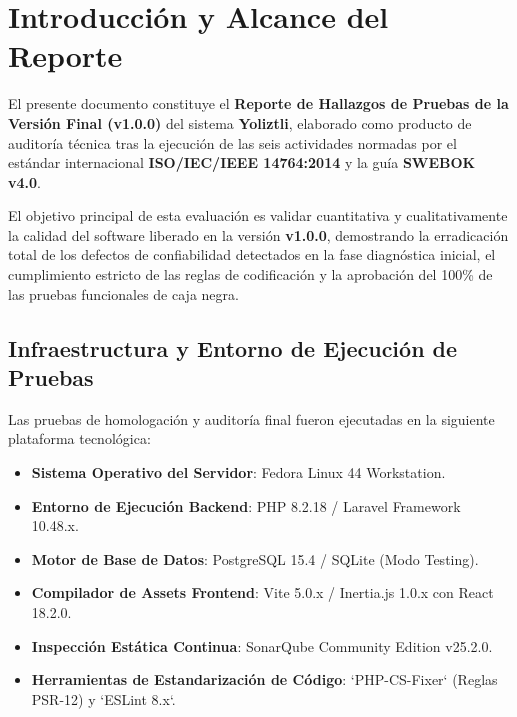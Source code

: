 \documentclass[12pt]{article}
\begin{document}


\newpage
{
\hypersetup{linkcolor=black}
\tableofcontents
}
\newpage

\section{Introducción y Alcance del Reporte}

El presente documento constituye el \textbf{Reporte de Hallazgos de Pruebas de la Versión Final (v1.0.0)} del sistema \textbf{Yoliztli}, elaborado como producto de auditoría técnica tras la ejecución de las seis actividades normadas por el estándar internacional \textbf{ISO/IEC/IEEE 14764:2014} y la guía \textbf{SWEBOK v4.0}.

El objetivo principal de esta evaluación es validar cuantitativa y cualitativamente la calidad del software liberado en la versión \textbf{v1.0.0}, demostrando la erradicación total de los defectos de confiabilidad detectados en la fase diagnóstica inicial, el cumplimiento estricto de las reglas de codificación y la aprobación del 100\% de las pruebas funcionales de caja negra.

\subsection{Infraestructura y Entorno de Ejecución de Pruebas}
Las pruebas de homologación y auditoría final fueron ejecutadas en la siguiente plataforma tecnológica:
\begin{itemize}
    \item \textbf{Sistema Operativo del Servidor}: Fedora Linux 44 Workstation.
    \item \textbf{Entorno de Ejecución Backend}: PHP 8.2.18 / Laravel Framework 10.48.x.
    \item \textbf{Motor de Base de Datos}: PostgreSQL 15.4 / SQLite (Modo Testing).
    \item \textbf{Compilador de Assets Frontend}: Vite 5.0.x / Inertia.js 1.0.x con React 18.2.0.
    \item \textbf{Inspección Estática Continua}: SonarQube Community Edition v25.2.0.
    \item \textbf{Herramientas de Estandarización de Código}: `PHP-CS-Fixer` (Reglas PSR-12) y `ESLint 8.x`.
\end{itemize}

\newpage
\end{document}
